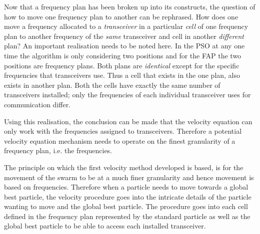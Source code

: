 Now that a frequency plan has been broken up into its constructs, the question of how to move one frequency plan to another can be rephrased. How does one move a frequency allocated to a \emph{transceiver} in a particular \emph{cell} of one frequency plan to another frequency of the \emph{same} transceiver and cell in another \emph{different} plan? An important realisation needs to be noted here. In the \gls{PSO} at any one time the algorithm is only considering two positions and for the \gls{FAP} the two positions are frequency plans. Both plans are \emph{identical} except for the specific frequencies that transceivers use. Thus a cell that exists in the one plan, also exists in another plan. Both the cells have exactly the same number of transceivers installed; only the frequencies of each individual transceiver uses for communication differ.

Using this realisation, the conclusion can be made that the velocity equation can only work with the frequencies assigned to transceivers. Therefore a potential velocity equation mechanism needs to operate on the finest granularity of a frequency plan, i.e. the frequencies.

The principle on which the first velocity method developed is based, is for the movement of the swarm to be at a much finer granularity and hence movement is based on frequencies. Therefore when a particle needs to move towards a global best particle, the velocity procedure goes into the intricate details of the particle wanting to move and the global best particle. The procedure goes into each cell defined in the frequency plan represented by the standard particle as well as the global best particle to be able to access each installed transceiver.

